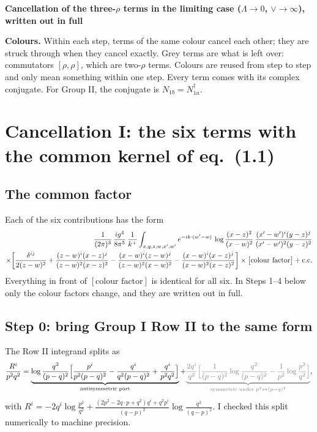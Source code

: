 \documentclass[10pt]{article}
\newcommand{\Gr}[1]{{\color{cX}#1}}
\begin{document}
\begin{center}{\large\bf Cancellation of the three-$\rho$ terms in the limiting case ($\Lambda\to0$, $\vee\to\infty$), written out in full}\end{center}

\noindent\textbf{Colours.} Within each step, terms of the same colour cancel each other; they are struck through when they cancel exactly. \Gr{Grey} terms are what is left over: commutators $[\rho,\rho]$, which are two-$\rho$ terms. Colours are reused from step to step and only mean something within one step. Every term comes with its complex conjugate. For Group II, the conjugate is $N_{1b}=N_{1a}^{\dagger}$.

\section{Cancellation I: the six terms with the common kernel of eq.\ (1.1)}

\subsection*{The common factor}
Each of the six contributions has the form
\begin{align}
\frac{1}{(2\pi)^{3}}\,\frac{ig^{4}}{8\pi^{5}}\,\frac{1}{k^{+}}\int_{x,y,z,w,x',w'}e^{-ik\cdot(w'-w)}\,\log\frac{(x-z)^{2}}{(x-w)^{2}}\,\frac{(x'-w')^{i}(y-z)^{j}}{(x'-w')^{2}(y-z)^{2}}\notag\\
\times\bigg[\frac{\delta^{ij}}{2(z-w)^{2}}+\frac{(z-w)^{i}(x-z)^{j}}{(z-w)^{2}(x-z)^{2}}-\frac{(x-w)^{i}(z-w)^{j}}{(z-w)^{2}(x-w)^{2}}-\frac{(x-w)^{i}(x-z)^{j}}{(x-w)^{2}(x-z)^{2}}\bigg]\times\big[\text{colour factor}\big]+{\rm c.c.}
\end{align}
Everything in front of $[\text{colour factor}]$ is identical for all six. In Steps 1--4 below only the colour factors change, and they are written out in full.

\subsection*{Step 0: bring Group I Row II to the same form}
The Row II integrand splits as
\begin{equation}
\frac{R^{i}}{p^{2}q^{2}}=\underbrace{\log\frac{q^{2}}{(p-q)^{2}}\Big[\frac{p^{i}}{p^{2}(p-q)^{2}}-\frac{q^{i}}{q^{2}(p-q)^{2}}+\frac{q^{i}}{p^{2}q^{2}}\Big]}_{\text{antisymmetric part}}
+\Gr{\underbrace{\frac{2q^{i}}{q^{2}}\Big[\frac{1}{(p-q)^{2}}\log\frac{q^{2}}{(p-q)^{2}}-\frac{1}{p^{2}}\log\frac{p^{2}}{q^{2}}\Big]}_{\text{symmetric under }p^{2}\leftrightarrow(p-q)^{2}}},
\end{equation}
with $R^{i}=-2q^{i}\log\frac{p^{2}}{q^{2}}+\frac{(2p^{2}-2q\cdot p+q^{2})q^{i}+q^{2}p^{i}}{(q-p)^{2}}\log\frac{q^{2}}{(q-p)^{2}}$. I checked this split numerically to machine precision.
\end{document}
